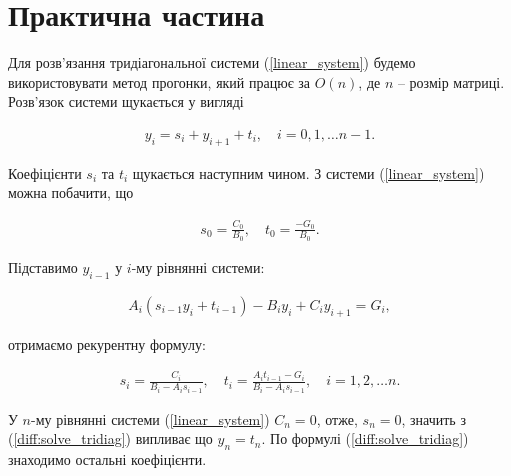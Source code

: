 
\section{Практична частина}

Для розв'язання тридіагональної системи (\ref{linear_system}) будемо використовувати метод прогонки, який працює за \(O(n)\), де \( n \) -- розмір матриці. Розв'язок системи щукається у вигляді

\begin{equation}
\begin{multlined} \label{diff:solve_tridiag}
y_i = s_i + y_{i+1} + t_i, \quad i = 0, 1, \dots n-1.
\end{multlined}
\end{equation}

Коефіцієнти \(s_i\) та \(t_i\) щукається наступним чином. З системи (\ref{linear_system}) можна побачити, що

\begin{equation}
\begin{multlined} 
s_0 = \frac{C_0}{B_0}, \quad t_0 = \frac{-G_0}{B_0}.
\end{multlined}
\end{equation}

Підставимо \( y_{i-1} \) у \(i\)-му рівнянні системи:

\begin{equation}
\begin{multlined} 
A_i\left(s_{i-1}y_i + t_{i-1}\right) - B_i y_i + C_iy_{i+1} = G_i,
\end{multlined}
\end{equation}

отримаємо рекурентну формулу:

\begin{equation}
\begin{multlined} 
s_i = \frac{C_i}{B_i-A_is_{i-1}}, \quad t_i = \frac{A_it_{i-1}-G_i}{B_i-A_is_{i-1}}, \quad i = 1, 2, \dots n.
\end{multlined}
\end{equation}

У \(n\)-му рівнянні системи (\ref{linear_system}) \(C_n = 0\), отже, \(s_n = 0\), значить з (\ref{diff:solve_tridiag}) випливає що \(y_n = t_n\). По формулі (\ref{diff:solve_tridiag}) знаходимо остальні коефіцієнти.

